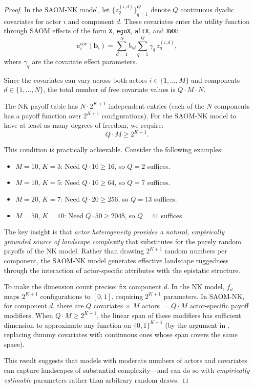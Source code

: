 \documentclass[12pt]{article}
\newcommand{\bb}{\mathbf{b}}
\begin{document}
\begin{proof}
In the SAOM-NK model, let $\{z_q^{(i,d)}\}_{q=1}^Q$ denote $Q$ continuous
dyadic covariates for actor $i$ and component $d$. These covariates enter the
utility function through SAOM effects of the form \texttt{X}, \texttt{egoX},
\texttt{altX}, and \texttt{XWX}:
\begin{equation}
\label{eq:covariate_utility}
  u_i^{\mathrm{cov}}(\bb_i) = \sum_{d=1}^{N} b_{id} \sum_{q=1}^{Q}
    \gamma_q \, z_q^{(i,d)},
\end{equation}
where $\gamma_q$ are the covariate effect parameters.

Since the covariates can vary across both actors $i \in \{1, \ldots, M\}$
and components $d \in \{1, \ldots, N\}$, the total number of free covariate
values is $Q \cdot M \cdot N$.

The NK payoff table has $N \cdot 2^{K+1}$ independent entries (each of the
$N$ components has a payoff function over $2^{K+1}$ configurations). For the
SAOM-NK model to have at least as many degrees of freedom, we require:
\begin{equation}
\label{eq:heterogeneity_condition}
  Q \cdot M \geq 2^{K+1}.
\end{equation}

This condition is practically achievable. Consider the following examples:
\begin{itemize}
  \item $M = 10$, $K = 3$: Need $Q \cdot 10 \geq 16$, so $Q = 2$ suffices.
  \item $M = 10$, $K = 5$: Need $Q \cdot 10 \geq 64$, so $Q = 7$ suffices.
  \item $M = 20$, $K = 7$: Need $Q \cdot 20 \geq 256$, so $Q = 13$ suffices.
  \item $M = 50$, $K = 10$: Need $Q \cdot 50 \geq 2048$, so $Q = 41$ suffices.
\end{itemize}

The key insight is that \emph{actor heterogeneity provides a natural,
empirically grounded source of landscape complexity} that substitutes for
the purely random payoffs of the NK model. Rather than drawing $2^{K+1}$
random numbers per component, the SAOM-NK model generates effective landscape
ruggedness through the interaction of actor-specific attributes with the
epistatic structure.

To make the dimension count precise: fix component $d$. In the NK model,
$f_d$ maps $2^{K+1}$ configurations to $[0,1]$, requiring $2^{K+1}$ parameters.
In SAOM-NK, for component $d$, there are $Q$ covariates $\times$ $M$ actors
$= Q \cdot M$ actor-specific payoff modifiers. When $Q \cdot M \geq 2^{K+1}$,
the linear span of these modifiers has sufficient dimension to approximate
any function on $\{0,1\}^{K+1}$ (by the argument in ,
replacing dummy covariates with continuous ones whose span covers the same
space).

This result suggests that models with moderate numbers of actors and covariates
can capture landscapes of substantial complexity---and can do so with
\emph{empirically estimable} parameters rather than arbitrary random draws.
\end{proof}
\end{document}
